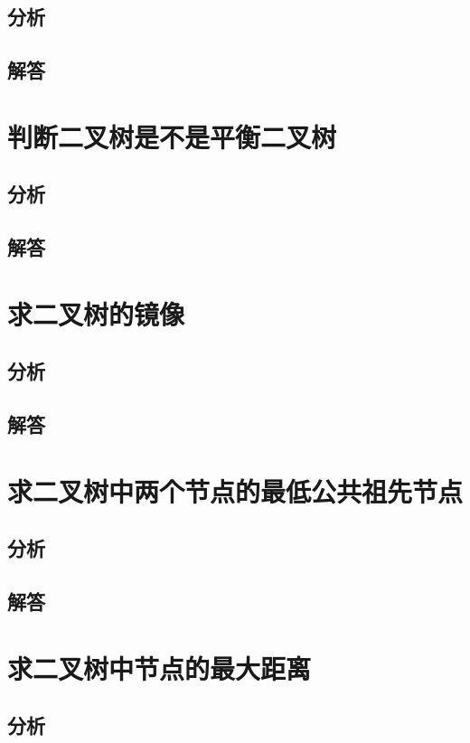 \documentclass[UTF8,a4paper,12pt]{ctexbook}
\begin{document}
	\subsection{分析}
	
	\subsection{解答}
\section{判断二叉树是不是平衡二叉树}
	\subsection{分析}
	
	\subsection{解答}
	
\section{求二叉树的镜像}
	\subsection{分析}
	
	\subsection{解答}
	
\section{求二叉树中两个节点的最低公共祖先节点}
	\subsection{分析}
	
	\subsection{解答}
	
\section{求二叉树中节点的最大距离}
	\subsection{分析}
	
\end{document}
